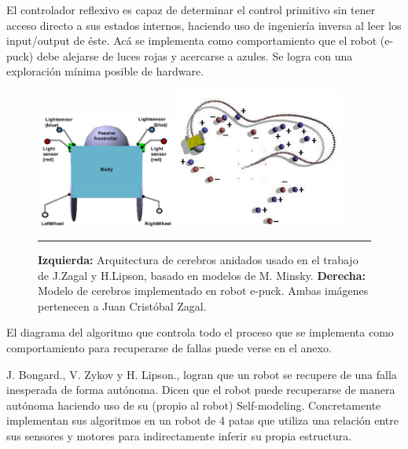 El controlador reflexivo es capaz de determinar el control primitivo sin tener acceso directo a sus estados internos, haciendo uso de ingeniería inversa al leer los input/output de éste. Acá se implementa como comportamiento que el robot (e-puck) debe alejarse de luces rojas y acercarse a azules. Se logra con una exploración mínima posible de hardware.

\begin{figure}[htbp]
	\centering
		\includegraphics[width=0.4\textwidth]{./Figures/robotTest.png}
		\includegraphics[width=0.5\textwidth]{./Figures/implementacion.png}
		\rule{35em}{0.5pt}
	\caption[Automodelado]{\textbf{Izquierda:} Arquitectura de cerebros anidados usado en el trabajo de J.Zagal y H.Lipson, basado en modelos de M. Minsky. \textbf{Derecha:} Modelo de cerebros implementado en robot e-puck. Ambas imágenes  pertenecen a Juan Cristóbal Zagal.}
	\label{fig:AutomodeladoTest}
\end{figure}


El diagrama del algoritmo que controla todo el proceso que se implementa como comportamiento para recuperarse de fallas puede verse en el anexo.

J. Bongard., V. Zykov y H. Lipson., logran que un robot se recupere de una falla inesperada de forma autónoma. Dicen que el robot puede recuperarse de manera autónoma haciendo uso de su (propio al robot) Self-modeling. Concretamente implementan sus algoritmos en un robot de 4 patas que utiliza una relación entre sus sensores y motores para indirectamente inferir su propia estructura.


